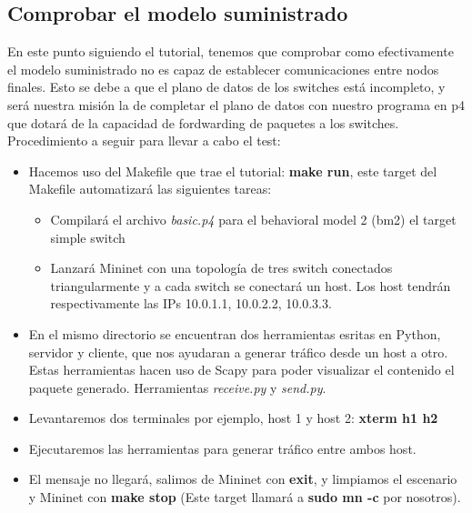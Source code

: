 \subsection{Comprobar el modelo suministrado}
En este punto siguiendo el tutorial, tenemos que comprobar como efectivamente el modelo suministrado no es capaz de establecer comunicaciones entre nodos finales. Esto se debe a que el plano de datos de los switches está incompleto, y será nuestra misión la de completar el plano de datos con nuestro programa en p4 que dotará de la capacidad de fordwarding de paquetes a los switches. \newline
\newline
Procedimiento a seguir para llevar a cabo el test:
\begin{itemize}
    \item Hacemos uso del Makefile que trae el tutorial: \textbf{make run}, este target del Makefile automatizará las siguientes tareas:
    \begin{itemize}
        \item Compilará el archivo \textit{basic.p4} para el behavioral model 2 (bm2) el target simple switch
        \item Lanzará Mininet con una topología de tres switch conectados triangularmente y a cada switch se conectará un host. Los host tendrán respectivamente las IPs 10.0.1.1, 10.0.2.2, 10.0.3.3. 
    \end{itemize}
    \item En el mismo directorio se encuentran dos herramientas esritas en Python, servidor y cliente, que nos ayudaran a generar tráfico desde un host a otro. Estas herramientas hacen uso de Scapy para poder visualizar el contenido el paquete generado. Herramientas \textit{receive.py} y \textit{send.py}. 
    \item Levantaremos dos terminales por ejemplo, host 1 y host 2: \textbf{xterm h1 h2}
    \item Ejecutaremos las herramientas para generar tráfico entre ambos host.
    \item El mensaje no llegará, salimos de Mininet con \textbf{exit}, y limpiamos el escenario y Mininet con \textbf{make stop} (Este target llamará a \textbf{sudo mn -c} por nosotros).
\end{itemize}


